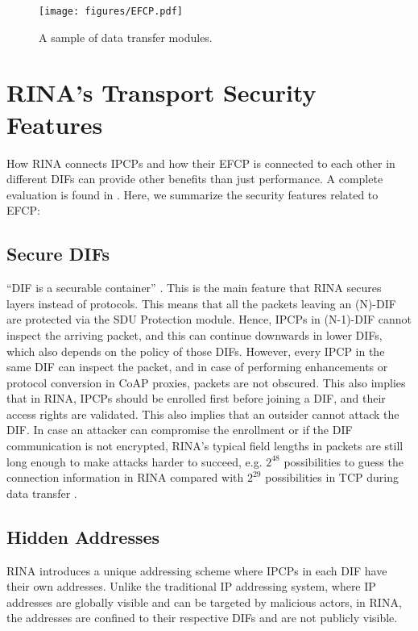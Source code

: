 \documentclass{ieeeaccess}
\begin{document}
\begin{figure}
	\centering
	\texttt{[image: figures/EFCP.pdf]}
	\caption{A sample of data transfer modules.}
	\label{fig:rina-efcp}
\end{figure}


\section{RINA's Transport Security Features} \label{sec:rina-trans}
How RINA connects IPCPs and how their EFCP is connected to each other in different DIFs can provide other benefits than just performance. A complete evaluation is found in \cite{ramezanifarkhani2018securing,small2012}. Here, we summarize the security features related to EFCP:

\subsection{Secure DIFs}
``DIF is a securable container'' \cite{boddapati2012assessing}. This is the main feature that RINA secures layers instead of protocols. This means that all the packets leaving an (N)-DIF are protected via the SDU Protection module. Hence, IPCPs in (N-1)-DIF cannot inspect the arriving packet, and this can continue downwards in lower DIFs, which also depends on the policy of those DIFs. However, every IPCP in the same DIF can inspect the packet, and in case of performing enhancements or protocol conversion in CoAP proxies, packets are not obscured. This also implies that in RINA, IPCPs should be enrolled first before joining a DIF, and their access rights are validated. This also implies that an outsider cannot attack the DIF. In case an attacker can compromise the enrollment or if the DIF communication is not encrypted, RINA's typical field lengths in packets are still long enough to make attacks harder to succeed, e.g. $2^{48}$ possibilities to guess the connection information in RINA compared with $2^{29}$ possibilities in TCP during data transfer \cite{boddapati2012assessing}.

\subsection{Hidden Addresses}
RINA introduces a unique addressing scheme where IPCPs in each DIF have their own addresses. Unlike the traditional IP addressing system, where IP addresses are globally visible and can be targeted by malicious actors, in RINA, the addresses are confined to their respective DIFs and are not publicly visible.
\end{document}
